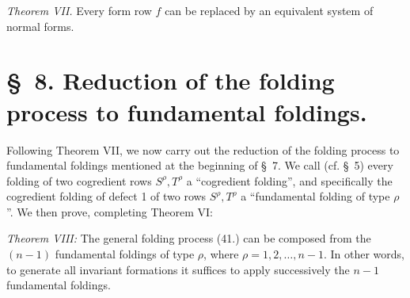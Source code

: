 \documentclass[11pt]{article}
\begin{document}
\emph{Theorem VII.} Every form row $f$ can be replaced by an equivalent system of normal forms.

\section*{\S\ 8. Reduction of the folding process to fundamental foldings.}
Following Theorem VII, we now carry out the reduction of the folding process to fundamental foldings mentioned at the beginning of \S\ 7. We call (cf. \S\ 5) every folding of two cogredient rows $S^\rho,T^\rho$ a ``cogredient folding'', and specifically the cogredient folding of defect 1 of two rows $S^\rho,T^\rho$ a ``fundamental folding of type $\rho$''. We then prove, completing Theorem VI:

\emph{Theorem VIII:} The general folding process (41.) can be composed from the $(n-1)$ fundamental foldings of type $\rho$, where $\rho=1,2,\ldots,n-1$. In other words, to generate all invariant formations it suffices to apply successively the $n-1$ fundamental foldings.
\end{document}
